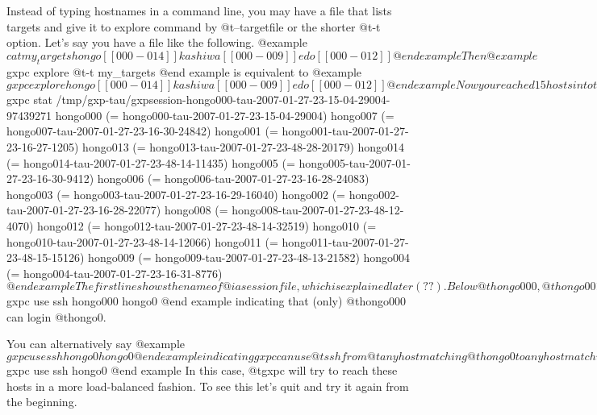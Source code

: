 Instead of typing hostnames in a command line, you may have a file
that lists targets and give it to explore command by 
@t{--targetfile} or the shorter @t{-t} option.
Let's say you have a file like the following.
@example
$ cat my_targets
hongo[[000-014]]
kashiwa[[000-009]]
edo[[000-012]]
@end example
Then
@example
$ gxpc explore @t{-t my_targets}
@end example
is equivalent to
@example
$ gxpc explore hongo[[000-014]] kashiwa[[000-009]] edo[[000-012]]
@end example

Now you reached 15 hosts in total. The @t{stat} command shows 
hosts (daemons) connected.

@example
$ gxpc stat
/tmp/gxp-tau/gxpsession-hongo000-tau-2007-01-27-23-15-04-29004-97439271
hongo000 (= hongo000-tau-2007-01-27-23-15-04-29004)
 hongo007 (= hongo007-tau-2007-01-27-23-16-30-24842)
 hongo001 (= hongo001-tau-2007-01-27-23-16-27-1205)
 hongo013 (= hongo013-tau-2007-01-27-23-48-28-20179)
 hongo014 (= hongo014-tau-2007-01-27-23-48-14-11435)
 hongo005 (= hongo005-tau-2007-01-27-23-16-30-9412)
 hongo006 (= hongo006-tau-2007-01-27-23-16-28-24083)
 hongo003 (= hongo003-tau-2007-01-27-23-16-29-16040)
 hongo002 (= hongo002-tau-2007-01-27-23-16-28-22077)
 hongo008 (= hongo008-tau-2007-01-27-23-48-12-4070)
 hongo012 (= hongo012-tau-2007-01-27-23-48-14-32519)
 hongo010 (= hongo010-tau-2007-01-27-23-48-14-12066)
 hongo011 (= hongo011-tau-2007-01-27-23-48-15-15126)
 hongo009 (= hongo009-tau-2007-01-27-23-48-13-21582)
 hongo004 (= hongo004-tau-2007-01-27-23-16-31-8776)
$
@end example

The first line shows the name of @i{a session file}, which is
explained later (??).  Below
@t{hongo000}, @t{hongo001}--@t{hongo014} are indented by a single space,
which means @t{hongo000} issued logins to all these hosts. This
happened because we have previously said
@example
$ gxpc use ssh hongo000 hongo0
@end example
indicating that (only) @t{hongo000} can login @t{hongo0}.

You can alternatively say
@example
$ gxpc use ssh hongo0 hongo0
@end example
indicating gxpc can use @t{ssh} from @t{any} host matching @t{hongo0}
to any host matching @t{hongo0}. This can be abbreviated to:
@example
$ gxpc use ssh hongo0
@end example
In this case, @t{gxpc} will try to reach these hosts in a more
load-balanced fashion. To see this let's quit and 
try it again from the beginning.

